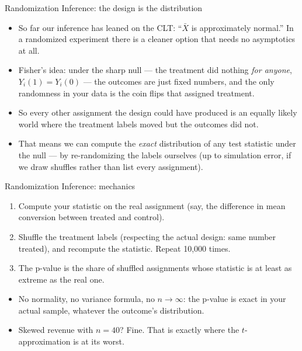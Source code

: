 \documentclass[aspectratio=169,11pt]{beamer}
\begin{document}
\begin{frame}{Randomization Inference: the design is the distribution}
\begin{itemize}
	\item So far our inference has leaned on the CLT: ``$\bar{X}$ is approximately
	normal.'' In a randomized experiment there is a cleaner option that needs
	\alert{no asymptotics at all}.

	\medskip
	\item Fisher's idea: under the \alert{sharp null} --- the treatment did nothing
	\emph{for anyone}, $Y_i(1) = Y_i(0)$ --- the outcomes are just fixed numbers, and
	the \alert{only} randomness in your data is the coin flips that assigned treatment.

	\medskip
	\item So every other assignment the design could have produced is an equally likely
	world where the treatment labels moved but the outcomes did not.

	\medskip
	\item That means we can compute the \emph{exact} distribution of any test
	statistic under the null --- by re-randomizing the labels ourselves
	(up to simulation error, if we draw shuffles rather than list every assignment).
\end{itemize}
\end{frame}


\begin{frame}{Randomization Inference: mechanics}
\begin{enumerate}
	\item Compute your statistic on the real assignment (say, the difference in mean
	conversion between treated and control).

	\medskip
	\item \alert{Shuffle the treatment labels} (respecting the actual design: same
	number treated), and recompute the statistic. Repeat 10{,}000 times.

	\medskip
	\item The p-value is the share of shuffled assignments whose statistic is at
	least as extreme as the real one.
\end{enumerate}
\bigskip
\begin{itemize}
	\item No normality, no variance formula, no $n \rightarrow \infty$: the p-value
	is exact in your actual sample, whatever the outcome's distribution.
	\item Skewed revenue with $n = 40$? Fine. That is exactly where the
	$t$-approximation is at its worst.
\end{itemize}
\end{frame}
\end{document}
